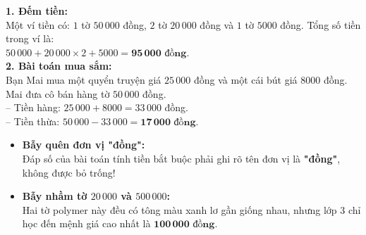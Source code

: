 \documentclass[11pt,a4paper]{article}
\begin{document}
\vspace{-2.5mm}
\noindent
\begin{minipage}[t]{0.49\textwidth}\vspace{0pt}
\begin{tcolorbox}[
  enhanced,
  colback=green!4!white,
  colframe=green!60!black,
  arc=2mm, boxrule=0.8pt,
  left=2mm, right=2mm, top=1.8mm, bottom=1.8mm,
  title={\footnotesize\bfseries\color{white}\faCheckCircle\ Ví dụ thực hành chuẩn mực}
]
{\footnotesize
\textbf{1. Đếm tiền:}\\
Một ví tiền có: $1$ tờ $50\,000$ đồng, $2$ tờ $20\,000$ đồng và $1$ tờ $5000$ đồng. Tổng số tiền trong ví là:\\
$50\,000 + 20\,000 \times 2 + 5000 = \mathbf{95\,000\text{ đồng}}$.\\
\textbf{2. Bài toán mua sắm:}\\
Bạn Mai mua một quyển truyện giá $25\,000$ đồng và một cái bút giá $8000$ đồng. Mai đưa cô bán hàng tờ $50\,000$ đồng.\\
-- Tiền hàng: $25\,000 + 8000 = 33\,000$ đồng.\\
-- Tiền thừa: $50\,000 - 33\,000 = \mathbf{17\,000\text{ đồng}}$.
}
\end{tcolorbox}
\end{minipage}
\hfill
\begin{minipage}[t]{0.49\textwidth}\vspace{0pt}
\begin{tcolorbox}[
  enhanced,
  colback=red!4!white,
  colframe=red!70!black,
  arc=2mm, boxrule=0.8pt,
  left=2mm, right=2mm, top=1.8mm, bottom=1.8mm,
  title={\footnotesize\bfseries\color{white}\faExclamationTriangle\ Mẹo tránh bẫy trắc nghiệm}
]
{\footnotesize
\begin{itemize}\setlength{\itemsep}{1.5pt}\setlength{\leftskip}{-2.5mm}
  \item \textbf{Bẫy quên đơn vị "đồng":}\\
  Đáp số của bài toán tính tiền bắt buộc phải ghi rõ tên đơn vị là \textbf{"đồng"}, không được bỏ trống!
  \item \textbf{Bẫy nhầm tờ $20\,000$ và $500\,000$:}\\
  Hai tờ polymer này đều có tông màu xanh lơ gần giống nhau, nhưng lớp 3 chỉ học đến mệnh giá cao nhất là $\mathbf{100\,000\text{ đồng}}$.
\end{itemize}
}
\end{tcolorbox}
\end{minipage}
\end{document}

